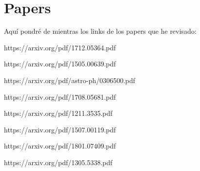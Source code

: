 \documentclass[twocolumn,           %
               showpacs,            %
               preprintnumbers,     %
               aps,                 %
               prl,          	    %
               letterpaper,             %
               superscriptaddress,      %
               nofootinbib,         %
               tightenlines,        %
               floats,floatfix      %
               ,usenatbib,
               ]{revtex4-1}
\begin{document}
\section{Papers} 
Aqu\'i pondré de mientras los links de los papers que he revisado:

https://arxiv.org/pdf/1712.05364.pdf

https://arxiv.org/pdf/1505.00639.pdf

https://arxiv.org/pdf/astro-ph/0306500.pdf

https://arxiv.org/pdf/1708.05681.pdf

https://arxiv.org/pdf/1211.3535.pdf

https://arxiv.org/pdf/1507.00119.pdf

https://arxiv.org/pdf/1801.07409.pdf

https://arxiv.org/pdf/1305.5338.pdf
\end{document}
